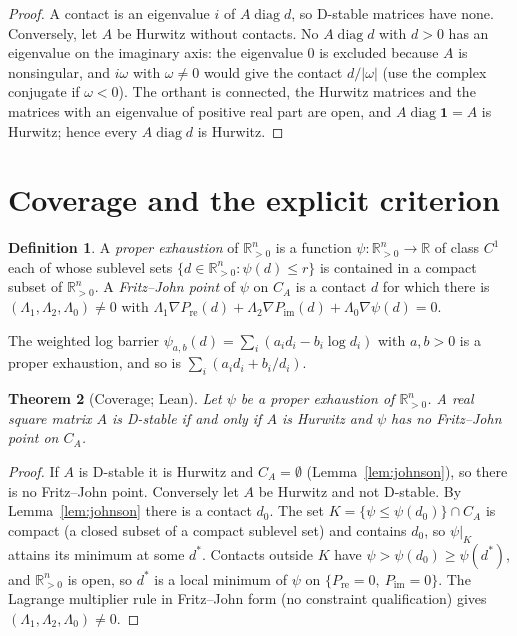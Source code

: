\documentclass[11pt,a4paper]{article}
\theoremstyle{plain}
\newtheorem{theorem}{Theorem}[section]
\theoremstyle{definition}
\newtheorem{definition}[theorem]{Definition}
\newcommand{\R}{\mathbb{R}}
\newcommand{\Rp}{\R^n_{>0}}
\newcommand{\diag}{\operatorname{diag}}
\newcommand{\Pre}{P_{\mathrm{re}}}
\newcommand{\Pim}{P_{\mathrm{im}}}
\begin{document}
\begin{proof}
A contact is an eigenvalue $i$ of $A\diag d$, so D-stable matrices have none. Conversely, let $A$ be Hurwitz
without contacts. No $A\diag d$ with $d>0$ has an eigenvalue on the imaginary axis: the eigenvalue $0$ is
excluded because $A$ is nonsingular, and $i\omega$ with $\omega\neq0$ would give the contact $d/|\omega|$
(use the complex conjugate if $\omega<0$). The orthant is connected, the Hurwitz matrices and the matrices
with an eigenvalue of positive real part are open, and $A\diag\mathbf 1=A$ is Hurwitz; hence every
$A\diag d$ is Hurwitz.
\end{proof}

\section{Coverage and the explicit criterion}\label{sec:coverage}

\begin{definition}\label{def:exhaustion}
A \emph{proper exhaustion} of $\Rp$ is a function $\psi\colon\Rp\to\R$ of class $C^1$ each of whose sublevel sets
$\{d\in\Rp:\psi(d)\le r\}$ is contained in a compact subset of $\Rp$. A \emph{Fritz--John point} of $\psi$ on $C_A$ is a contact $d$
for which there is $(\Lambda_1,\Lambda_2,\Lambda_0)\neq0$ with
$\Lambda_1\nabla\Pre(d)+\Lambda_2\nabla\Pim(d)+\Lambda_0\nabla\psi(d)=0$.
\end{definition}

The weighted log barrier $\psi_{a,b}(d)=\sum_i(a_id_i-b_i\log d_i)$ with $a,b>0$ is a proper exhaustion, and
so is $\sum_i(a_id_i+b_i/d_i)$.

\begin{theorem}[Coverage; Lean]\label{thm:coverage}
Let $\psi$ be a proper exhaustion of $\Rp$. A real square matrix $A$ is D-stable if and only if $A$ is
Hurwitz and $\psi$ has no Fritz--John point on $C_A$.
\end{theorem}

\begin{proof}
If $A$ is D-stable it is Hurwitz and $C_A=\emptyset$ (Lemma~\ref{lem:johnson}), so there is no Fritz--John
point. Conversely let $A$ be Hurwitz and not D-stable. By Lemma~\ref{lem:johnson} there is a contact $d_0$.
The set $K=\{\psi\le\psi(d_0)\}\cap C_A$ is compact (a closed subset of a compact sublevel set) and contains
$d_0$, so $\psi|_K$ attains its minimum at some $d^{*}$. Contacts outside $K$ have $\psi>\psi(d_0)\ge\psi(d^{*})$,
and $\Rp$ is open, so $d^{*}$ is a local minimum of $\psi$ on $\{\Pre=0,\ \Pim=0\}$. The Lagrange multiplier rule
in Fritz--John form (no constraint qualification) gives $(\Lambda_1,\Lambda_2,\Lambda_0)\neq0$.
\end{proof}
\end{document}

